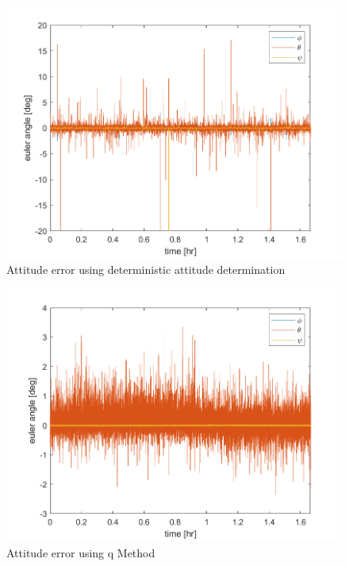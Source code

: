 \begin{figure}[H]
\centering
\includegraphics[scale=0.6]{Images/ps7_problem2_DADFict.png}
\caption{Attitude error using deterministic attitude determination}
\label{fig:ps7_problem2_DADFict}
\end{figure}

\begin{figure}[H]
\centering
\includegraphics[scale=0.6]{Images/ps7_problem2_qMethod.png}
\caption{Attitude error using q Method}
\label{fig:ps7_problem2_qMethod}
\end{figure}

